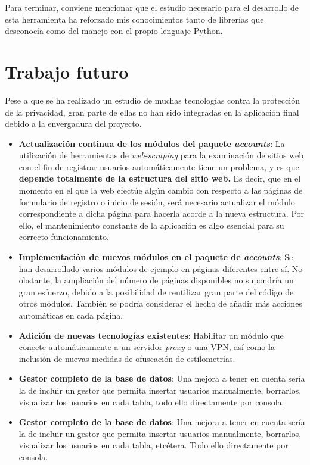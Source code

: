 Para terminar, conviene mencionar que el estudio necesario para el desarrollo de esta herramienta ha reforzado mis conocimientos tanto de librerías que desconocía como del manejo con el propio lenguaje Python. 

\section{Trabajo futuro}

Pese a que se ha realizado un estudio de muchas tecnologías contra la protección de la privacidad, gran parte de ellas no han sido integradas en la aplicación final debido a la envergadura del proyecto.

\begin{itemize}
	\item \textbf{Actualización continua de los módulos del paquete \textit{accounts}}: La utilización de herramientas de \textit{web-scraping} para la examinación de sitios web con el fin de registrar usuarios automáticamente tiene un problema, y es que \textbf{depende totalmente de la estructura del sitio web.} Es decir, que en el momento en el que la web efectúe algún cambio con respecto a las páginas de formulario de registro o inicio de sesión, será necesario actualizar el módulo correspondiente a dicha página para hacerla acorde a la nueva estructura. Por ello, el mantenimiento constante de la aplicación es algo esencial para su correcto funcionamiento.
	\item \textbf{Implementación de nuevos módulos en el paquete de \textit{accounts}}: Se han desarrollado varios módulos de ejemplo en páginas diferentes entre sí. No obstante, la ampliación del número de páginas disponibles no supondría un gran esfuerzo, debido a la posibilidad de reutilizar gran parte del código de otros módulos. También se podría considerar el hecho de añadir más acciones automáticas en cada página.
	\item \textbf{Adición de nuevas tecnologías existentes}: Habilitar un módulo que conecte automáticamente a un servidor \textit{proxy} o una VPN, así como la inclusión de nuevas medidas de ofuscación de estilometrías.
	\item \textbf{Gestor completo de la base de datos}: Una mejora a tener en cuenta sería la de incluir un gestor que permita insertar usuarios manualmente, borrarlos, visualizar los usuarios en cada tabla, todo ello directamente por consola.
	\item \textbf{Gestor completo de la base de datos}: Una mejora a tener en cuenta sería la de incluir un gestor que permita insertar usuarios manualmente, borrarlos, visualizar los usuarios en cada tabla, etcétera. Todo ello directamente por consola.	

\end{itemize}
